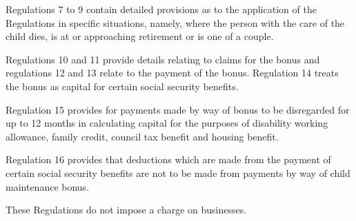 \documentclass[12pt,a4paper]{article}
\begin{document}
  Regulations 7 to 9 contain detailed provisions as to the application of the Regulations in specific situations, namely, where the person with the care of the child dies, is at or approaching retirement or is one of a couple.

  Regulations 10 and 11 provide details relating to claims for the bonus and regulations 12 and 13 relate to the payment of the bonus. Regulation 14 treats the bonus as capital for certain social security benefits.

  Regulation 15 provides for payments made by way of bonus to be disregarded for up to 12 months in calculating capital for the purposes of disability working allowance, family credit, council tax benefit and housing benefit.

  Regulation 16 provides that deductions which are made from the payment of certain social security benefits are not to be made from payments by way of child maintenance bonus.

  These Regulations do not impose a charge on businesses.
\end{document}
